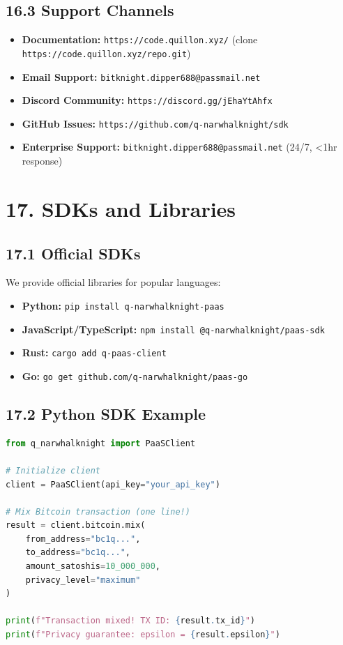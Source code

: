 \documentclass[11pt,a4paper]{article}
\begin{document}
\subsection{16.3 Support Channels}

\begin{itemize}
    \item \textbf{Documentation:} \texttt{https://code.quillon.xyz/} (clone \texttt{https://code.quillon.xyz/repo.git})
    \item \textbf{Email Support:} \texttt{bitknight.dipper688@passmail.net}
    \item \textbf{Discord Community:} \texttt{https://discord.gg/jEhaYtAhfx}
    \item \textbf{GitHub Issues:} \texttt{https://github.com/q-narwhalknight/sdk}
    \item \textbf{Enterprise Support:} \texttt{bitknight.dipper688@passmail.net} (24/7, <1hr response)
\end{itemize}

\section{17. SDKs and Libraries}

\subsection{17.1 Official SDKs}

We provide official libraries for popular languages:

\begin{itemize}
    \item \textbf{Python:} \texttt{pip install q-narwhalknight-paas}
    \item \textbf{JavaScript/TypeScript:} \texttt{npm install @q-narwhalknight/paas-sdk}
    \item \textbf{Rust:} \texttt{cargo add q-paas-client}
    \item \textbf{Go:} \texttt{go get github.com/q-narwhalknight/paas-go}
\end{itemize}

\subsection{17.2 Python SDK Example}

\begin{lstlisting}[language=python]
from q_narwhalknight import PaaSClient

# Initialize client
client = PaaSClient(api_key="your_api_key")

# Mix Bitcoin transaction (one line!)
result = client.bitcoin.mix(
    from_address="bc1q...",
    to_address="bc1q...",
    amount_satoshis=10_000_000,
    privacy_level="maximum"
)

print(f"Transaction mixed! TX ID: {result.tx_id}")
print(f"Privacy guarantee: epsilon = {result.epsilon}")
\end{lstlisting}
\end{document}
